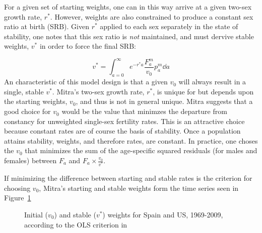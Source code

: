 For a given set of starting weights, one can in this way arrive at a given two-sex growth rate, $r^\ast$. 
However, weights are also constrained to produce a constant sex ratio at birth (SRB). Given $r^\ast$ applied 
to each sex separately in the
state of stability, one notes that this sex ratio is \textit{not} maintained,
and must dervive stable weights, $v^\ast$ in order to force the final
SRB:

\begin{equation}
v^\ast =  \int _{a = 0} ^\infty e ^{ -r^\ast a} \frac{F_a ^m}{v_0} p_a^m \dd a
\end{equation}
An characteristic of this model design is that a given $v_0$ will always result
in a single, stable $v^\ast$. Mitra's two-sex growth rate, $r^\ast$, is unique for but depends upon 
the starting weights, $v_0$, and thus is not in general unique. Mitra 
suggests that a good choice for $v_0$ would be the value that minimzes the 
departure from constancy for unweighted single-sex fertility
rates. This is an attractive choice because constant rates are of course the
basis of stability. Once a population attains stability, weights, and therefore 
rates, are constant. In practice, one
choses the $v_0$ that minimizes the sum of the age-specific squared residuals
(for males and females) between $F_a$ and $F_a \times \tfrac{v_0}{v^\ast}$. 

If minimizing the difference between starting and stable rates is the criterion
for choosing $v_0$, Mitra's starting and stable weights form the time
series seen in Figure~\ref{fig:Mitra1978v0vstar}

\begin{figure}[ht!]
        \centering  
          \caption{Initial ($v_0$) and stable ($v^\ast$) weights for Spain and
          US, 1969-2009, according to the OLS criterion in
          \citet{mitra1978derivation}}
           \quad
          \label{fig:Mitra1978v0vstar}
\end{figure}

